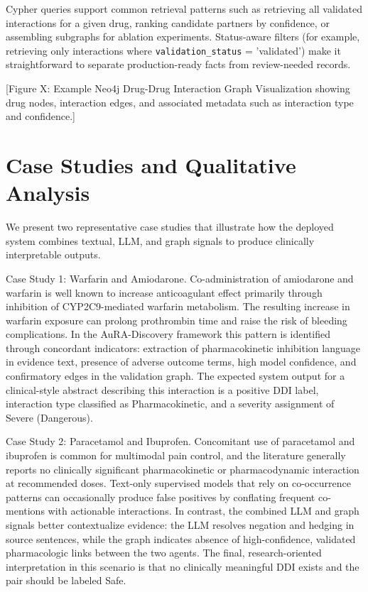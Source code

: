 \documentclass[conference]{Template/IEEEtran}
\begin{document}
Cypher queries support common retrieval patterns such as retrieving all validated interactions for a given drug, ranking candidate partners by confidence, or assembling subgraphs for ablation experiments. Status-aware filters (for example, retrieving only interactions where \texttt{validation\_status} = 'validated') make it straightforward to separate production-ready facts from review-needed records.

[Figure X: Example Neo4j Drug-Drug Interaction Graph Visualization showing drug nodes, interaction edges, and associated metadata such as interaction type and confidence.]

\section{Case Studies and Qualitative Analysis}
We present two representative case studies that illustrate how the deployed system combines textual, LLM, and graph signals to produce clinically interpretable outputs.

Case Study 1: Warfarin and Amiodarone. Co-administration of amiodarone and warfarin is well known to increase anticoagulant effect primarily through inhibition of CYP2C9-mediated warfarin metabolism. The resulting increase in warfarin exposure can prolong prothrombin time and raise the risk of bleeding complications. In the AuRA-Discovery framework this pattern is identified through concordant indicators: extraction of pharmacokinetic inhibition language in evidence text, presence of adverse outcome terms, high model confidence, and confirmatory edges in the validation graph. The expected system output for a clinical-style abstract describing this interaction is a positive DDI label, interaction type classified as Pharmacokinetic, and a severity assignment of Severe (Dangerous).

Case Study 2: Paracetamol and Ibuprofen. Concomitant use of paracetamol and ibuprofen is common for multimodal pain control, and the literature generally reports no clinically significant pharmacokinetic or pharmacodynamic interaction at recommended doses. Text-only supervised models that rely on co-occurrence patterns can occasionally produce false positives by conflating frequent co-mentions with actionable interactions. In contrast, the combined LLM and graph signals better contextualize evidence: the LLM resolves negation and hedging in source sentences, while the graph indicates absence of high-confidence, validated pharmacologic links between the two agents. The final, research-oriented interpretation in this scenario is that no clinically meaningful DDI exists and the pair should be labeled Safe.
\end{document}

